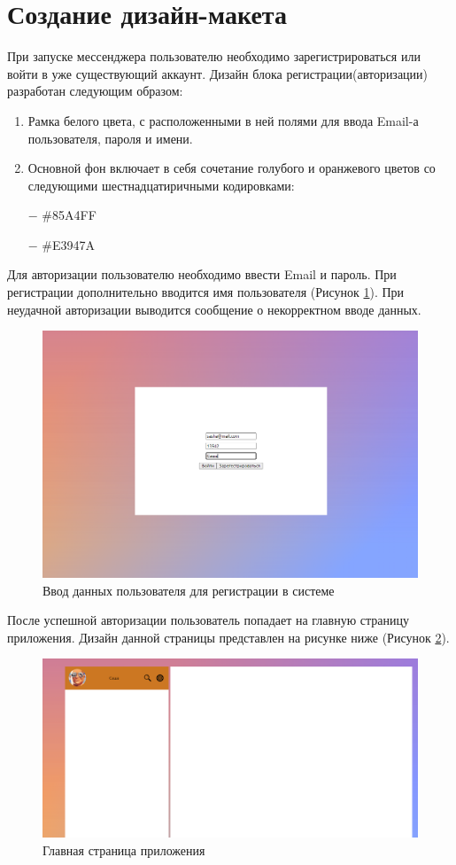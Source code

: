 \documentclass[14pt,final]{report}
\begin{document}
\section{Создание дизайн-макета}
При запуске мессенджера пользователю необходимо зарегистрироваться или войти в уже существующий аккаунт.
Дизайн блока регистрации(авторизации) разработан следующим образом:
\begin{enumerate}
\item Рамка белого цвета, с расположенными в ней полями для ввода Email-а пользователя, пароля и имени.
\item Основной фон включает в себя сочетание голубого и оранжевого цветов со следующими шестнадцатиричными кодировками: 
\par
$-$ \#85A4FF
\par
$-$ \#E3947A 
\end{enumerate}
Для авторизации пользователю необходимо ввести Email и пароль. При регистрации дополнительно вводится имя пользователя (Рисунок \ref{fig:my_label}). При неудачной авторизации выводится сообщение о некорректном вводе данных.
\begin{figure}[H]
    \centering
    \includegraphics[width=14cm]{registr.png}
    \caption{Ввод данных пользователя для регистрации в системе}
    \label{fig:my_label}
\end{figure}
После успешной авторизации пользователь попадает на главную страницу приложения. Дизайн данной страницы представлен на рисунке ниже (Рисунок \ref{fig:my_label1}).
\begin{figure}[H]
    \centering
    \includegraphics[width=14cm]{vhod.png}
    \caption{Главная страница приложения}
    \label{fig:my_label1}
\end{figure}
\end{document}

